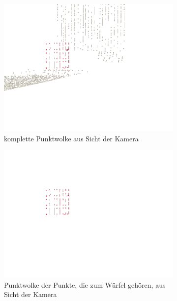\documentclass[ngerman,a4paper,parskip=half]{scrartcl}
\begin{document}
\begin{figure}[H]
	\centering
	\begin{subfigure}{0.45\textwidth}
		\includegraphics[width=\textwidth]{includes/peak_red_cam.png}
		\caption{komplette Punktwolke aus Sicht der Kamera}
	\end{subfigure}
	\hfill
	\begin{subfigure}{0.45\textwidth}
		\includegraphics[width=\textwidth]{includes/peak_only_red_cam.png}
		\caption{Punktwolke der Punkte, die zum Würfel gehören, aus Sicht der Kamera}
	\end{subfigure}
	\begin{subfigure}{0.45\textwidth}

\end{subfigure}
\end{figure}
\end{document}
